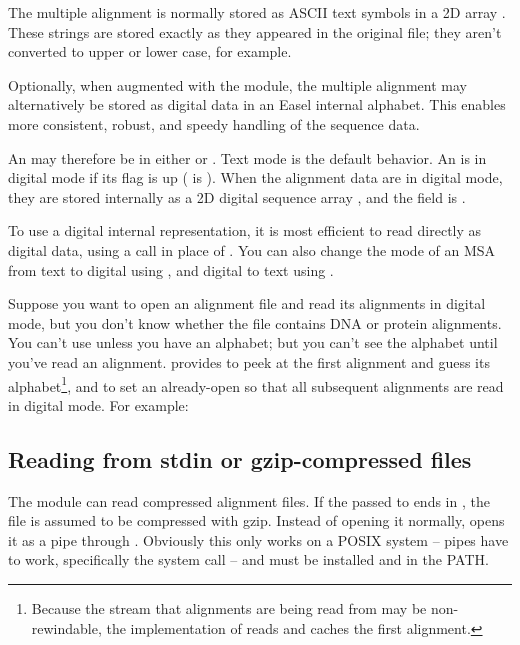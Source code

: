 The multiple alignment is normally stored as ASCII text symbols in a
2D array . These strings are
stored exactly as they appeared in the original file; they aren't
converted to upper or lower case, for example.  

Optionally, when augmented with the  module, the
multiple alignment may alternatively be stored as digital data in an
Easel internal alphabet. This enables more consistent, robust, and
speedy handling of the sequence data.

An  may therefore be in either  or
. Text mode is the default behavior. An
 is in digital mode if its  flag
is up ( is ). When the
alignment data are in digital mode, they are stored internally as a 2D
digital sequence array , and
the  field is .

To use a digital internal representation, it is most efficient to read
directly as digital data, using a 
call in place of . You can also change the
mode of an MSA from text to digital using
, and digital to text using
.

Suppose you want to open an alignment file and read its alignments in
digital mode, but you don't know whether the file contains DNA or
protein alignments. You can't use 
unless you have an alphabet; but you can't see the alphabet until
you've read an alignment. \Easel provides
 to peek at the first alignment
and guess its alphabet\footnote{Because the stream that alignments are
being read from may be non-rewindable, the implementation of
 reads and caches the first
alignment.}, and  to set an
already-open  so that all subsequent alignments
are read in digital mode. For example: 



\subsection{Reading from stdin or gzip-compressed files}

The module can read compressed alignment files.  If the
 passed to  ends in
, the file is assumed to be compressed with gzip. Instead
of opening it normally,  opens it as a pipe
through . Obviously this only works on a POSIX
system -- pipes have to work, specifically the  system
call -- and  must be installed and in the PATH.


